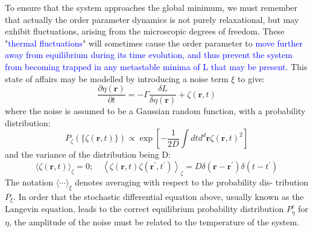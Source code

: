 \documentclass[12pt,titlepage]{article}
\newcommand{\bluep}[1]{\textcolor{blue}{#1}}
\numberwithin{equation}{section}
\begin{document}
To ensure that the system approaches the global
minimum, we must remember that actually the order parameter dynamics is not purely relaxational, but may exhibit fluctuations, arising from the microscopic degrees of freedom. These "\bluep{thermal fluctuations}" will sometimes cause the order parameter to \bluep{move further away from equilibrium
during its time evolution, and thus prevent the system from becoming trapped in any metastable minima of L that may be present.} This state of affairs may be modelled by introducing a noise term $\xi$ to give:
\begin{equation}
\frac{\partial \eta(\mathbf{r})}{\partial t}=-\Gamma \frac{\delta L}{\delta \eta(\mathbf{r})}+\zeta(\mathbf{r}, t)
\end{equation}
where the noise is assumed to be a Gaussian random function, with a probability distribution:
\begin{equation}
P_{\zeta}(\{\zeta(\mathbf{r}, t)\}) \propto \exp \left[-\frac{1}{2 D} \int d t d^{d} \mathbf{r} \zeta(\mathbf{r}, t)^{2}\right]
\end{equation}
and the variance of the distribution being D:
\begin{equation}
\langle\zeta(\mathbf{r}, t)\rangle_{\zeta}=0 ; \quad\left\langle\zeta(\mathbf{r}, t) \zeta\left(\mathbf{r}^{\prime}, t^{\prime}\right)\right\rangle_{\zeta}=D \delta\left(\mathbf{r}-\mathbf{r}^{\prime}\right) \delta\left(t-t^{\prime}\right)
\end{equation}
The notation $\langle\cdots\rangle_{\xi}$ denotes averaging with respect to the probability dis-
tribution $P_{\xi} .$ In order that the stochastic differential equation above, usually known as the Langevin equation, leads to the correct equilibrium probability distribution $P_{\eta}^e$ for $\eta$, the amplitude of the noise must be related to the temperature of the system.
\end{document}
